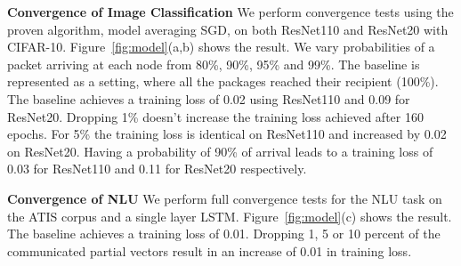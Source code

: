 \documentclass{article}
\renewcommand{\paragraph}[1]{\noindent\textbf{#1}}
\newcounter{ass_counter}
\newcounter{thm_counter}
\begin{document}
\paragraph{Convergence of Image Classification} We perform convergence tests using the proven algorithm, model averaging SGD, on both ResNet110 and ResNet20 with CIFAR-10. Figure~\ref{fig:model}(a,b) shows
the result. We vary probabilities of a packet arriving at each node from 80\%, 90\%, 95\% and 99\%. The baseline is represented as a setting, where all the packages reached their recipient (100\%). The baseline achieves a training loss of 0.02 using ResNet110 and 0.09 for ResNet20. Dropping 1\% doesn't increase the training loss achieved after 160 epochs. For 5\% the training loss is identical on ResNet110 and increased by 0.02 on ResNet20. Having a probability of 90\% of arrival leads to a training loss of 0.03 for ResNet110 and 0.11 for ResNet20 respectively.

\paragraph{Convergence of NLU} We perform full convergence tests for the NLU task on the ATIS corpus and a single layer LSTM.
Figure~\ref{fig:model}(c) shows the result. The baseline achieves a training loss of 0.01. Dropping 1, 5 or 10 percent of the communicated partial vectors result in an increase of 0.01 in training loss.

\end{document}
